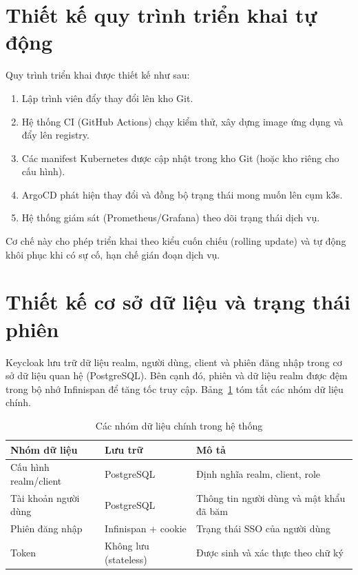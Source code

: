 \section{Thiết kế quy trình triển khai tự động}
\label{sec:quytrinh}

Quy trình triển khai được thiết kế như sau:

\begin{enumerate}
  \item Lập trình viên đẩy thay đổi lên kho Git.
  \item Hệ thống CI (GitHub Actions) chạy kiểm thử, xây dựng image ứng dụng và
  đẩy lên registry.
  \item Các manifest Kubernetes được cập nhật trong kho Git (hoặc kho riêng
  cho cấu hình).
  \item ArgoCD phát hiện thay đổi và đồng bộ trạng thái mong muốn lên cụm k3s.
  \item Hệ thống giám sát (Prometheus/Grafana) theo dõi trạng thái dịch vụ.
\end{enumerate}

Cơ chế này cho phép triển khai theo kiểu cuốn chiếu (rolling update) và tự
động khôi phục khi có sự cố, hạn chế gián đoạn dịch vụ.

\section{Thiết kế cơ sở dữ liệu và trạng thái phiên}
\label{sec:csdl}

Keycloak lưu trữ dữ liệu realm, người dùng, client và phiên đăng nhập trong cơ
sở dữ liệu quan hệ (PostgreSQL). Bên cạnh đó, phiên và dữ liệu realm được đệm
trong bộ nhớ Infinispan để tăng tốc truy cập. Bảng~\ref{tab:data} tóm tắt các
nhóm dữ liệu chính.

\begin{table}[htbp]
\centering
\caption{Các nhóm dữ liệu chính trong hệ thống}
\label{tab:data}
\small
\begin{tabular}{p{3.4cm} p{3.2cm} p{7cm}}
\toprule
\textbf{Nhóm dữ liệu} & \textbf{Lưu trữ} & \textbf{Mô tả}\\
\midrule
Cấu hình realm/client & PostgreSQL & Định nghĩa realm, client, role\\
Tài khoản người dùng & PostgreSQL & Thông tin người dùng và mật khẩu đã băm\\
Phiên đăng nhập & Infinispan + cookie & Trạng thái SSO của người dùng\\
Token & Không lưu (stateless) & Được sinh và xác thực theo chữ ký\\
\bottomrule
\end{tabular}
\end{table}

